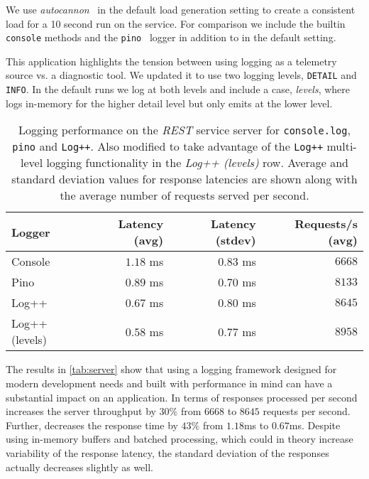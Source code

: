 We use \emph{autocannon}~\cite{autocannon} in the default load generation 
setting to create a consistent load for a 10 second run on the service.
For comparison we include the builtin \texttt{console} methods 
and the \texttt{pino}~\cite{pino} logger in addition to \projn in the default 
setting.

This application highlights the tension between using logging as a telemetry source 
vs. a diagnostic tool. We updated it to use two logging levels, \texttt{DETAIL} 
and \texttt{INFO}. In the default runs we log at both levels and include a case, 
\emph{levels}, where \projn logs in-memory for the higher detail level but only 
emits at the lower level.

\begin{table}[t]  
    \centering
    {\small
    \begin{tabular}{l | r r r }
    Logger       & Latency (avg) & Latency (stdev) & Requests/s (avg) \\
    \hline
    Console        & $1.18$ ms & $0.83$ ms & $6668$   \\
    Pino           & $0.89$ ms & $0.70$ ms & $8133$   \\
    Log++          & $0.67$ ms & $0.80$ ms & $8645$   \\
    Log++ (levels) & $0.58$ ms & $0.77$ ms & $8958$   \\
    \end{tabular}
    }
    \vspace{2mm}
    \caption{\small Logging performance on the \emph{REST} service server for \texttt{console.log}, 
    \texttt{pino} and \texttt{Log++}. Also modified to take advantage of the \texttt{Log++} 
    multi-level logging functionality in the \emph{Log++ (levels)} row. Average and 
    standard deviation values for response latencies are shown along with the average 
    number of requests served per second.}
    \label{tab:server}
\end{table}

The results in \autoref{tab:server} show that using a logging framework designed 
for modern development needs and built with performance in mind can have a 
substantial impact on an application. In terms of responses processed per second 
\projn increases the server throughput by $30\%$ from $6668$ to $8645$ requests 
per second. Further, \projn decreases the response time by $43\%$ 
from $1.18$ms to $0.67$ms. Despite using in-memory buffers and batched processing, 
which could in theory increase variability of the response latency, the standard deviation of 
the responses actually decreases slightly as well.

